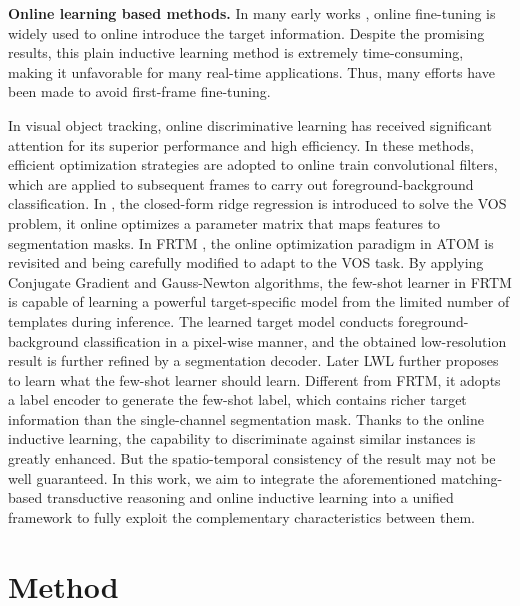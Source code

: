 \documentclass[10pt,twocolumn,letterpaper]{article}
\begin{document}
\noindent\textbf{Online learning based methods.} 
In many early works \cite{Bao2018A,Cae2017A,static2017A,dyenet2018,premvos2018A,Man2018B,onavos2017A,MoNet2018A},
online fine-tuning is widely used to online introduce the target information. Despite the promising results, this plain inductive learning method is extremely time-consuming, making it unfavorable for many real-time applications. Thus, many efforts \cite{blazingly2018A,TrackPart2018A,d3s2020A,siamask2019A,OSMN2018A,Zhang_luhuchuan_2019A} have been made to avoid first-frame fine-tuning.

In visual object tracking, online discriminative learning  \cite{dimp2019A,eco2017A,atom2019A,prdimp2020A,Wang_2021_Transformer} has received significant attention for its superior performance and high efficiency. In these methods, efficient optimization strategies are adopted to online train convolutional filters, which are applied to subsequent frames to carry out foreground-background classification. In \cite{META2019A}, the closed-form ridge regression \cite{MLCS2019A} is introduced to solve the VOS problem, it online optimizes a parameter matrix that maps features to segmentation masks. In FRTM \cite{frtm2020A}, the online optimization paradigm in ATOM \cite{atom2019A} is revisited and being carefully modified to adapt to the VOS task. By applying Conjugate Gradient and Gauss-Newton algorithms, the few-shot learner in FRTM is capable of learning a powerful target-specific model from the limited number of templates during inference. The learned target model conducts foreground-background classification in a pixel-wise manner, and the obtained low-resolution result is further refined by a segmentation decoder. Later LWL \cite{Goutam2020A} further proposes to learn what the few-shot learner should learn. Different from FRTM, it adopts a label encoder to generate the few-shot label, which contains richer target information than the single-channel segmentation mask. Thanks to the online inductive learning, the capability to discriminate against similar instances is greatly enhanced. But the spatio-temporal consistency of the result may not be well guaranteed.
In this work, we aim to integrate the aforementioned matching-based transductive reasoning and online inductive learning into a unified framework to fully exploit the complementary characteristics between them.


\section{Method}
\end{document}

